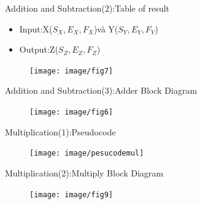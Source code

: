 \documentclass[11pt]{beamer}
\begin{document}
\begin{frame}[t]{Addition and Subtraction(2):Table of result}
\begin{itemize}
\item Input:X($S_X,E_X,F_X$)và Y($S_Y,E_Y,F_Y$)
\item Output:Z($S_Z,E_Z,F_Z$)
\end{itemize}
\begin{center}
    \begin{figure}[htp]
    \begin{center}
     \texttt{[image: image/fig7]}
    \end{center}
    \label{reffig7}
    \end{figure}
\end{center}
\end{frame}
\begin{frame}[t]{Addition and Subtraction(3):Adder Block Diagram}
\begin{center}
    \begin{figure}[htp]
    \begin{center}
     \texttt{[image: image/fig6]}
    \end{center}
    \label{reffig6}
    \end{figure}
\end{center}
\end{frame}
\begin{frame}[t]{Multiplication(1):Pseudocode}
\begin{center}
    \begin{figure}[htp]
    \begin{center}
     \texttt{[image: image/pesucodemul]}
    \end{center}
    \label{refpesucodemul}
    \end{figure}
\end{center}
\end{frame}
\begin{frame}[t]{Multiplication(2):Multiply Block Diagram}
\begin{center}
    \begin{figure}[htp]
    \begin{center}
     \texttt{[image: image/fig9]}
    \end{center}
    \label{reffig9}
    \end{figure}
\end{center}
\end{frame}
\end{document}
